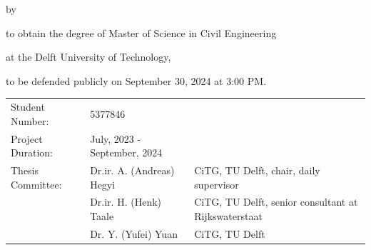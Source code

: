 \begin{titlepage}

\begin{center}

{\makeatletter
\largetitlestyle\fontsize{35}{45}\selectfont\@title
\makeatother}

{\makeatletter
\ifdefvoid{\@subtitle}{}{\bigskip\titlestyle\fontsize{20}{20}\selectfont\@subtitle}
\makeatother}

\bigskip
\bigskip

by

\bigskip
\bigskip

{\makeatletter
\largetitlestyle\fontsize{25}{25}\selectfont\@author
\makeatother}

\bigskip
\bigskip

to obtain the degree of Master of Science in Civil Engineering

at the Delft University of Technology,

to be defended publicly on September 30, 2024 at 3:00 PM.




\vfill


\begin{center}
    

\begin{tabular}{lll}
Student Number:   & 5377846                   &                                                      \\
Project Duration: & July, 2023 - September, 2024   &                                                      \\
Thesis Committee: & Dr.ir. A. (Andreas) Hegyi & CiTG, TU Delft, chair, daily supervisor              \\
                  & Dr.ir. H. (Henk) Taale    & CiTG, TU Delft, senior consultant at Rijkswaterstaat \\
                  & Dr. Y. (Yufei) Yuan       & CiTG, TU Delft                                      
\end{tabular}
\end{center}
\bigskip
\bigskip


\end{center}
\end{titlepage}
